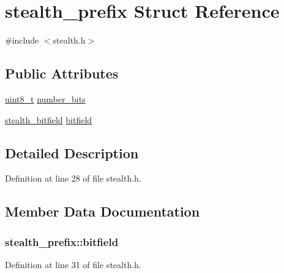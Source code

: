\hypertarget{structstealth__prefix}{}\section{stealth\+\_\+prefix Struct Reference}
\label{structstealth__prefix}


{\ttfamily \#include $<$stealth.\+h$>$}

\subsection*{Public Attributes}
\begin{DoxyCompactItemize}
\item 
\hyperlink{stdint_8h_aba7bc1797add20fe3efdf37ced1182c5}{uint8\+\_\+t} \hyperlink{structstealth__prefix_a59f7003da36853b8b5c4872eaab0df84}{number\+\_\+bits}
\item 
\hyperlink{stealth_8h_a08216bd133211b2b931197ca400e8105}{stealth\+\_\+bitfield} \hyperlink{structstealth__prefix_a84c55002d8d4188e9c1ecb6be9c4531d}{bitfield}
\end{DoxyCompactItemize}


\subsection{Detailed Description}


Definition at line 28 of file stealth.\+h.



\subsection{Member Data Documentation}
\hypertarget{structstealth__prefix_a84c55002d8d4188e9c1ecb6be9c4531d}{}
\subsubsection[{bitfield}]{ stealth\+\_\+prefix\+::bitfield}\label{structstealth__prefix_a84c55002d8d4188e9c1ecb6be9c4531d}


Definition at line 31 of file stealth.\+h.

\hypertarget{structstealth__prefix_a59f7003da36853b8b5c4872eaab0df84}{}
